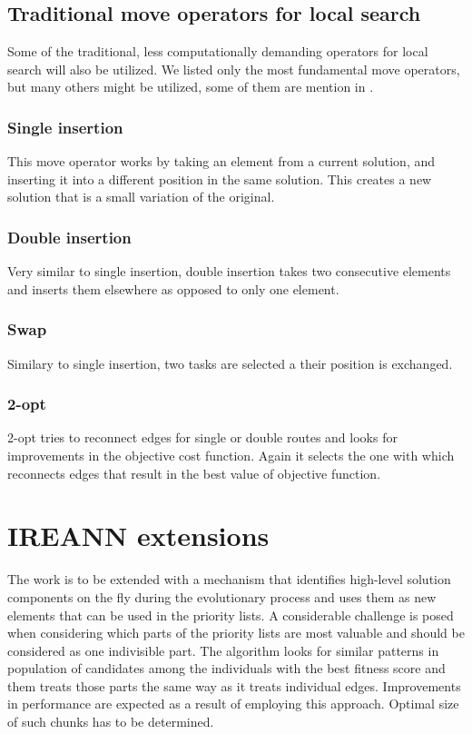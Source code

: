 \documentclass[oneside]{ctuthesis}
\theoremstyle{plain}
\theoremstyle{definition}
\theoremstyle{note}
\begin{document}
\subsection{Traditional move operators for local search}
Some of the traditional, less computationally demanding operators for local search will also be utilized. We listed only the most fundamental move operators, but many others might be utilized, some of them are mention in \cite{BEULLENS2003629}.
\subsubsection{Single insertion}
This move operator works by taking an element from a current solution, and inserting it into a different position in the same solution. This creates a new solution that is a small variation of the original. 
\subsubsection{Double insertion}
Very similar to single insertion, double insertion takes two consecutive elements and inserts them elsewhere as opposed to only one element.
\subsubsection{Swap}
Similary to single insertion, two tasks are selected a their position is exchanged.
\subsubsection{2-opt}
2-opt tries to reconnect edges for single or double routes and looks for improvements in the objective cost function. Again it selects the one with which reconnects edges that result in the best value of objective function.

\section{IREANN extensions}
The work is to be extended with a mechanism that identifies high-level solution components on the fly during the evolutionary process and uses them as new elements that can be used in the priority lists. A considerable challenge is posed when considering which parts of the priority lists are most valuable and should be considered as one indivisible part. The algorithm looks for similar patterns in population of candidates among the individuals with the best fitness score and them treats those parts the same way as it treats individual edges. Improvements in performance are expected as a result of employing this approach. Optimal size of such chunks has to be determined.	
\end{document}
